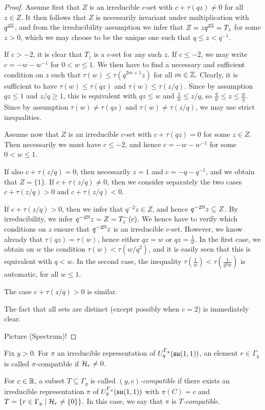 \begin{proof} Assume first that $Z$ is an irreducible $c$-set with $c+\tau(qz)\neq 0$ for all $z\in Z$. It then follows that $Z$ is necessarily invariant under multiplication with $q^{2\mathbb{Z}}$, and from the irreducibility assumption we infer that $Z = zq^{2\mathbb{Z}}=T_z$ for some $z>0$, which we may choose to be the unique one such that $q\leq z<q^{-1}$. 

If $c>-2$, it is clear that $T_z$ is a $c$-set for any such $z$. If $c\leq -2$, we may write $c=-w-w^{-1}$ for $0< w\leq 1$. We then have to find a necessary and sufficient condition on $z$ such that $\tau(w)\leq \tau(q^{2m+1}z)$ for all $m\in \mathbb{Z}$. Clearly, it is sufficient to have $\tau(w)\leq \tau(qz)$ and $\tau(w)\leq \tau(z/q)$. Since by assumption $qz\leq 1$ and $z/q\geq 1$, this is equivalent with $qz\leq w$ and $\frac{1}{w}\leq z/q$, so $\frac{q}{w}\leq z\leq \frac{w}{q}$. Since by assumption $\tau(w)\neq \tau(qz)$ and $\tau(w)\neq \tau(z/q)$, we may use strict inequalities.

Assume now that  $Z$ is an irreducible $c$-set with $c+\tau(qz)=0$ for some $z\in Z$. Then necessarily we must have $c\leq -2$, and hence $c= -w-w^{-1}$ for some $0< w\leq 1$. 

If also $c+\tau(z/q)=0$, then necessarily $z=1$ and $c= -q-q^{-1}$, and we obtain that $Z=\{1\}$. If $c+\tau(z/q)\neq 0$, then we consider separately the two cases $c+\tau(z/q)>0$ and $c+\tau(z/q)<0$. 

If $c+\tau(z/q)>0$, then we infer that $q^{-2}z\in Z$, and hence $q^{-2\mathbb{N}}z\subseteq Z$. By irreducibility, we infer $q^{-2\mathbb{N}}z = Z= T_z^-(c)$. We hence have to verify which conditions on $z$ ensure that $q^{-2\mathbb{N}}z$ is an irreducible $c$-set. However, we know already that $\tau(qz)=\tau(w)$, hence either $qz = w$ or $qz = \frac{1}{w}$. In the first case, we obtain on $w$ the condition $\tau(w)<\tau(w/q^2)$, and it is easily seen that this is equivalent with $q<w$. In the second case, the inequality $\tau(\frac{1}{w})<\tau(\frac{1}{q^2w})$ is automatic, for all $w\leq 1$.  

The case $c+\tau(z/q)>0$ is similar. 

The fact that all sets are distinct (except possibly when $c=2$) is immediately clear. 

Picture (Spectrum)!
\end{proof} 


\begin{Def} Fix $y>0$. For $\pi$ an irreducible representation of $U_q^{\Gamma_y}(\mathfrak{su}(1,1))$, an element $r\in \Gamma_y$ is called $\pi$-compatible if $\mathcal{H}_r\neq 0$. 

For $c\in \mathbb{R}$, a subset $T\subseteq \Gamma_y$ is called \emph{$(y,c)$-compatible} if there exists an irreducible representation $\pi$ of $U_q^{\Gamma_y}(\mathfrak{su}(1,1))$ with $\pi(C) = c$ and $T=\{r\in \Gamma_y\mid \mathcal{H}_{r}\neq \{0\}\}$. In this case, we say that $\pi$ is \emph{$T$-compatible}.
\end{Def}

